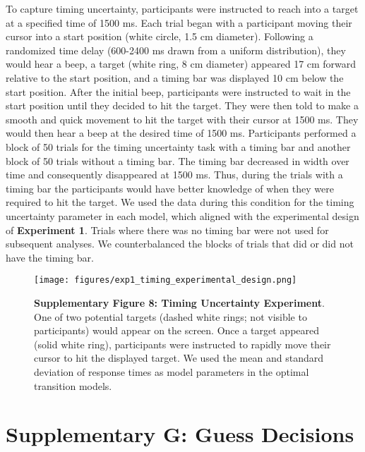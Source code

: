 \documentclass[man,floatsintext,letterpaper,12pt]{apa7}
\newcommand\boldblue[1]{\textcolor{mydarkblue}{\textbf{#1}}}
\begin{document}
\noindent To capture timing uncertainty, participants were instructed to reach into a target at a specified time of 1500 ms. Each trial began with a participant moving their cursor into a start position (white circle, 1.5 cm diameter). Following a randomized time delay (600-2400 ms drawn from a uniform distribution), they would hear a beep, a target (white ring, 8 cm diameter) appeared 17 cm forward relative to the start position, and a timing bar was displayed 10 cm below the start position. After the initial beep, participants were instructed to wait in the start position until they decided to hit the target. They were then told to make a smooth and quick movement to hit the target with their cursor at 1500 ms. They would then hear a beep at the desired time of 1500 ms. Participants performed a block of 50 trials for the timing uncertainty task with a timing bar and another block of 50 trials without a timing bar. The timing bar decreased in width over time and consequently disappeared at 1500 ms. Thus, during the trials with a timing bar the participants would have better knowledge of when they were required to hit the target. We used the data during this condition for the timing uncertainty parameter in each model, which aligned with the experimental design of \boldblue{Experiment 1}. Trials where there was no timing bar were not used for subsequent analyses. We counterbalanced the blocks of trials that did or did not have the timing bar.
\begin{figure}[H]
    \centering
    \texttt{[image: figures/exp1\_timing\_experimental\_design.png]}

    \caption*{\boldblue{Supplementary Figure 8: Timing Uncertainty Experiment}. One of two potential targets (dashed white rings; not visible to participants) would appear on the screen. Once a target appeared (solid white ring), participants were instructed to rapidly move their cursor to hit the displayed target. We used the mean and standard deviation of response times as model parameters in the optimal transition models.}
\end{figure}

\section{Supplementary G: Guess Decisions}
\end{document}

